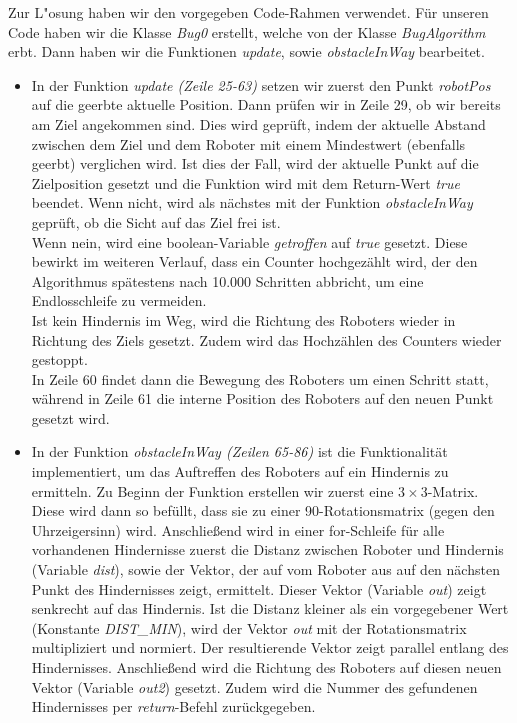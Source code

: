 \documentclass[a4paper]{scrartcl}
\begin{document}
Zur L"osung haben wir den vorgegeben Code-Rahmen verwendet. Für unseren Code haben wir die Klasse \textit{Bug0} erstellt, welche von der Klasse \textit{BugAlgorithm} erbt. Dann haben wir die Funktionen \textit{update}, sowie \textit{obstacleInWay} bearbeitet.\\
\begin{itemize}
\item In der Funktion \textit{update (Zeile 25-63)} setzen wir zuerst den Punkt \textit{robotPos} auf die geerbte aktuelle Position. Dann prüfen wir in Zeile 29, ob wir bereits am Ziel angekommen sind. Dies wird geprüft, indem der aktuelle Abstand zwischen dem Ziel und dem Roboter mit einem Mindestwert (ebenfalls geerbt) verglichen wird. Ist dies der Fall, wird der aktuelle Punkt auf die Zielposition gesetzt und die Funktion wird mit dem Return-Wert \textit{true} beendet. Wenn nicht, wird als nächstes mit der Funktion \textit{obstacleInWay} geprüft, ob die Sicht auf das Ziel frei ist. \\
Wenn nein, wird eine boolean-Variable \textit{getroffen} auf \textit{true} gesetzt. Diese bewirkt im weiteren Verlauf, dass ein Counter hochgezählt wird, der den Algorithmus spätestens nach 10.000 Schritten abbricht, um eine Endlosschleife zu vermeiden. \\
Ist kein Hindernis im Weg, wird die Richtung des Roboters wieder in Richtung des Ziels gesetzt. Zudem wird das Hochzählen des Counters wieder gestoppt.\\

In Zeile 60 findet dann die Bewegung des Roboters um einen Schritt statt, während in Zeile 61 die interne Position des Roboters auf den neuen Punkt gesetzt wird.

\item In der Funktion \textit{obstacleInWay (Zeilen 65-86)} ist die Funktionalität implementiert, um das Auftreffen des Roboters auf ein Hindernis zu ermitteln. Zu Beginn der Funktion erstellen wir zuerst eine $3\times3$-Matrix. Diese wird dann so befüllt, dass sie zu einer 90\textdegree -Rotationsmatrix (gegen den Uhrzeigersinn) wird. Anschließend wird in einer for-Schleife für alle vorhandenen Hindernisse zuerst die Distanz zwischen Roboter und Hindernis (Variable \textit{dist}), sowie der Vektor, der auf vom Roboter aus auf den nächsten Punkt des Hindernisses zeigt, ermittelt. Dieser Vektor (Variable \textit{out}) zeigt senkrecht auf das Hindernis. Ist die Distanz kleiner als ein vorgegebener Wert (Konstante \textit{DIST\_MIN}), wird der Vektor \textit{out} mit der Rotationsmatrix multipliziert und normiert. Der resultierende Vektor zeigt parallel entlang des Hindernisses. Anschließend wird die Richtung des Roboters auf diesen neuen Vektor (Variable \textit{out2}) gesetzt. Zudem wird die Nummer des gefundenen Hindernisses per \textit{return}-Befehl zurückgegeben.
\end{itemize}
\end{document}
